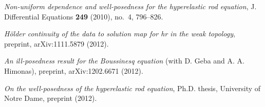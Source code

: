 \documentclass[12pt]{article}
\begin{document}
\nocite{Geba:2012}
\nocite{Karapetyan:2010fk}
\nocite{Karapetyan:2011}
\nocite{Karapetyan:2012}
\large
\providecommand{\bysame}{\leavevmode\hbox to3em{\hrulefill}\thinspace}
\providecommand{\MR}{\relax\ifhmode\unskip\space\fi MR }
\providecommand{\MRhref}[2]{%
  \href{http://www.ams.org/mathscinet-getitem?mr=#1}{#2}
}
\providecommand{\href}[2]{#2}
\begin{thebibliography}{1}

\href{http://davidkarapetyan.com/pdfs/hr_nud.pdf}{\emph{Non-uniform dependence and well-posedness for the
hyperelastic rod equation}}, J. Differential Equations \textbf{249} (2010),
  no.~4, 796--826.

\href{http://davidkarapetyan.com/pdfs/hr_holder_cont.pdf}{\emph{H{\"o}lder continuity of the data to solution map for hr in the
weak topology}}, preprint, arXiv:1111.5879 (2012).

\href{http://davidkarapetyan.com/pdfs/boussinesq.pdf}{\emph{An
ill-posedness result for the Boussinesq equation}} (with D. Geba and A. A. Himonas), preprint, arXiv:1202.6671
  (2012).

\href{http://davidkarapetyan.com/pdfs/thesis.pdf}{\emph{On the well-posedness of the hyperelastic rod equation}}, Ph.D.
thesis, University of Notre Dame, preprint (2012).

\end{thebibliography}
        
        
\end{document}
